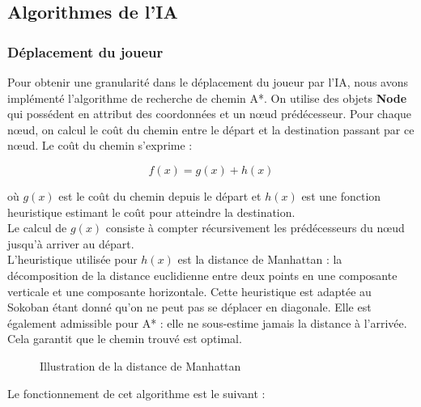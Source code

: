 \documentclass[a4paper,12pt]{article} %
\begin{document}
\subsection{Algorithmes de l'IA}

\subsubsection{Déplacement du joueur}

Pour obtenir une granularité dans le déplacement du joueur par l'IA, nous avons implémenté l'algorithme de recherche de chemin A*. On utilise des objets \textbf{Node} qui possédent en attribut des coordonnées et un nœud prédécesseur. Pour chaque nœud, on calcul le coût du chemin entre le départ et la destination passant par ce nœud. Le coût du chemin s'exprime :

$$ f(x) = g(x) + h(x)$$

où $g(x)$ est le coût du chemin depuis le départ et $h(x)$ est une fonction heuristique estimant le coût pour atteindre la destination.\\

Le calcul de $g(x)$ consiste à compter récursivement les prédécesseurs du nœud jusqu'à arriver au départ.\\
L'heuristique utilisée pour $h(x)$ est la distance de Manhattan : la décomposition de la distance euclidienne entre deux points en une composante verticale et une composante horizontale. Cette heuristique est adaptée au Sokoban étant donné qu'on ne peut pas se déplacer en diagonale. Elle est également admissible pour A* : elle ne sous-estime jamais la distance à l'arrivée. Cela garantit que le chemin trouvé est optimal.

\begin{figure}[!h]
\centering
{}
\caption{Illustration de la distance de Manhattan}
\end{figure}

Le fonctionnement de cet algorithme est le suivant :\\
\end{document}
